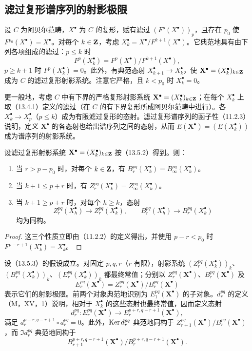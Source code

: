 \subsection{滤过复形谱序列的射影极限}
设 $C$ 为阿贝尔范畴，$X^\bullet$ 为 $C$ 的复形，赋有滤过 $(F^p(X^\bullet))_p$，且存在 $p_0$ 使 $F^{p_0}(X^\bullet)=X^\bullet$。对每个 $k\in\mathbf Z$，考虑 $X_k^\bullet=X^\bullet/F^{k+1}(X^\bullet)$。它典范地具有由下列各项组成的滤过：$p\leq k$ 时
\[
F^p(X_k^\bullet)=F^p(X^\bullet)/F^{k+1}(X^\bullet),
\]
$p\geq k+1$ 时 $F^p(X_k^\bullet)=0$。此外，有典范态射 $X_{k+1}^\bullet\to X_k^\bullet$，使 $\mathbf X^\bullet=(X_k^\bullet)_{k\in\mathbf Z}$ 成为 $C$ 的滤过复形射影系统。注意它严格，且 $k<p_0$ 时 $X_k^\bullet=0$。

更一般地，考虑 $C$ 中有下界的严格复形射影系统 $\mathbf X^\bullet=(X_k^\bullet)_{k\in\mathbf Z}$；在每个 $X_k^\bullet$ 上取（13.4.1）定义的滤过（在 $C$ 的有下界复形所成阿贝尔范畴中进行）。各 $X_k^\bullet\to X_p^\bullet$（$p\leq k$）成为有限滤过复形的态射。滤过复形谱序列的函子性（11.2.3）说明，定义 $\mathbf X^\bullet$ 的各态射也给出谱序列之间的态射，从而 $E(\mathbf X^\bullet)=(E(X_k^\bullet))$ 成为谱序列的射影系统。

设滤过复形射影系统 $\mathbf X^\bullet=(X_k^\bullet)_{k\in\mathbf Z}$ 按（13.5.2）得到。则：
\begin{enumerate}[label=\alph*)]
\item 当 $r>p-p_0$ 时，对每个 $k\in\mathbf Z$，有 $B_r^{pq}(X_k^\bullet)=B_\infty^{pq}(X_k^\bullet)$。
\item 当 $k+1\leq p+r$ 时，有 $Z_r^{pq}(X_k^\bullet)=Z_\infty^{pq}(X_k^\bullet)$。
\item 当 $k+1\geq p+r$ 时，对每个 $h\geq k$，态射
\[
Z_r^{pq}(X_h^\bullet)\to Z_r^{pq}(X_k^\bullet),\qquad
B_r^{pq}(X_h^\bullet)\to B_r^{pq}(X_k^\bullet)
\]
均为同构。
\end{enumerate}
\begin{proof}
这三个性质立即由（11.2.2）的定义得出，并使用 $p-r<p_0$ 时 $F^{p-r+1}(X_k^\bullet)=X_k^\bullet$。
\end{proof}

设（13.5.3）的假设成立。对固定 $p,q,r$（$r$ 有限），射影系统 $(Z_r^{pq}(X_k^\bullet))_k$、$(B_r^{pq}(X_k^\bullet))_k$、$(E_r^{pq}(X_k^\bullet))_k$ 都最终常值；分别以 $Z_r^{pq}(\mathbf X^\bullet)$、$B_r^{pq}(\mathbf X^\bullet)$ 及
\[
E_r^{pq}(\mathbf X^\bullet)=Z_r^{pq}(\mathbf X^\bullet)/B_r^{pq}(\mathbf X^\bullet)
\]
表示它们的射影极限。前两个对象典范地识别为 $E_1^{pq}(\mathbf X^\bullet)$ 的子对象。$d_r^{pq}$ 的定义（M，XV，1）说明，相对于 $X_k^\bullet$ 的这些态射也最终常值，因而定义态射
\begin{equation}\tag{13.5.4.1}
d_r^{pq}:E_r^{pq}(\mathbf X^\bullet)\to E_r^{p+r,q-r+1}(\mathbf X^\bullet),
\end{equation}
满足 $d_r^{p+r,q-r+1}\circ d_r^{pq}=0$。此外，$\operatorname{Ker} d_r^{pq}$ 典范地同构于 $Z_{r+1}^{pq}(\mathbf X^\bullet)/B_r^{pq}(\mathbf X^\bullet)$，而 $\Im d_r^{pq}$ 典范地同构于
\[
B_{r+1}^{p+r,q-r+1}(\mathbf X^\bullet)/B_r^{p+r,q-r+1}(\mathbf X^\bullet).
\]

